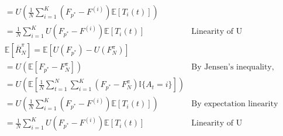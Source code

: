 \documentclass{article}
\begin{document}
\begin{enumerate}
\begin{itemize}
\begin{itemize}
\begin{align}
                 &= U\left(\frac{1}{N} \sum_{i = 1}^{K} \left(F_{p^\ast} - F^{(i)}\right) \mathbb{E}\left[T_i(t)\right]\right)\\
                 &=\frac{1}{N} \sum_{i = 1}^{K}  U\left(F_{p^\ast} - F^{(i)}\right) \mathbb{E}\left[T_i(t)\right] & \text{Linearity of U}\\
                 & \mathbb{E}[\overline{R}_N^{\pi}]
                 = \mathbb{E}\left[U\left(F_{p^{*}}\right)-U\left(F_{N}^{\pi}\right)\right]\\
                 &=U\left(\mathbb{E}\left[F_{p^{*}}-F_{N}^{\pi}\right]\right) & \text{By Jensen's inequality, when U is affine (linear)}\\
                  &= U\left(\mathbb{E}\left[\frac{1}{N} \sum_{t=1}^{N} \sum_{i = 1}^{K} \left(F_{p^{*}}-F_{N}^{\pi}\right) \mathbb{I}\{A_t = i\}\right]\right)\\
                 &= U\left(\frac{1}{N} \sum_{i = 1}^{K} \left(F_{p^\ast} - F^{(i)}\right) \mathbb{E}\left[T_i(t)\right]\right) & \text{By expectation linearity}\\
                 &=\frac{1}{N} \sum_{i = 1}^{K}  U\left(F_{p^\ast} - F^{(i)}\right) \mathbb{E}\left[T_i(t)\right] & \text{Linearity of U}
                \end{align}
                

\end{itemize}
\end{itemize}
\end{enumerate}
\end{document}
